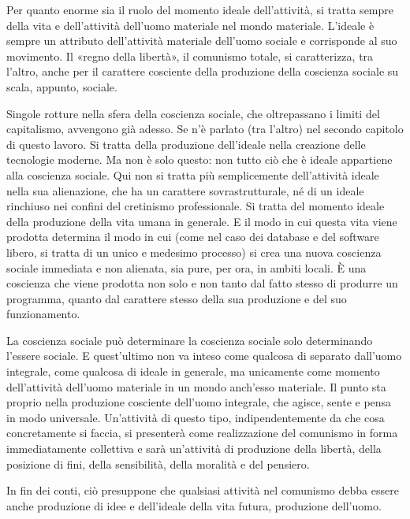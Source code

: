 \documentclass[../main]{subfiles}
\begin{document}
Per quanto enorme sia il ruolo del momento ideale dell'attività, si tratta sempre della vita e dell'attività dell'uomo materiale nel mondo materiale. L'ideale è sempre un attributo dell'attività materiale dell'uomo sociale e corrisponde al suo movimento. Il «regno della libertà», il comunismo totale, si caratterizza, tra l'altro, anche per il carattere cosciente della produzione della coscienza sociale su scala, appunto, sociale.

Singole rotture nella sfera della coscienza sociale, che oltrepassano i limiti del capitalismo, avvengono già adesso. Se n'è parlato (tra l'altro) nel secondo capitolo di questo lavoro. Si tratta della produzione dell'ideale nella creazione delle tecnologie moderne. Ma non è solo questo: non tutto ciò che è ideale appartiene alla coscienza sociale. Qui non si tratta più semplicemente dell'attività ideale nella sua alienazione, che ha un carattere sovrastrutturale, né di un ideale rinchiuso nei confini del cretinismo professionale. Si tratta del momento ideale della produzione della vita umana in generale. E il modo in cui questa vita viene prodotta determina il modo in cui (come nel caso dei database e del software libero, si tratta di un unico e medesimo processo) si crea una nuova coscienza sociale immediata e non alienata, sia pure, per ora, in ambiti locali. È una coscienza che viene prodotta non solo e non tanto dal fatto stesso di produrre un programma, quanto dal carattere stesso della sua produzione e del suo funzionamento.

La coscienza sociale può determinare la coscienza sociale solo determinando l'essere sociale. E quest'ultimo non va inteso come qualcosa di separato dall'uomo integrale, come qualcosa di ideale in generale, ma unicamente come momento dell'attività dell'uomo materiale in un mondo anch'esso materiale. Il punto sta proprio nella produzione cosciente dell'uomo integrale, che agisce, sente e pensa in modo universale. Un'attività di questo tipo, indipendentemente da che cosa concretamente si faccia, si presenterà come realizzazione del comunismo in forma immediatamente collettiva e sarà un'attività di produzione della libertà, della posizione di fini, della sensibilità, della moralità e del pensiero.

In fin dei conti, ciò presuppone che qualsiasi attività nel comunismo debba essere anche produzione di idee e dell'ideale della vita futura, produzione dell'uomo.
\end{document}
